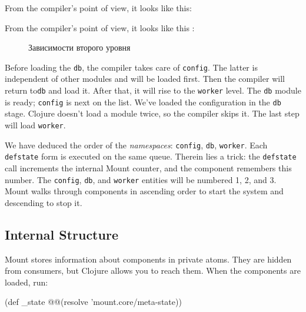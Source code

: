\fi

\ifx\MODE\PRINT

\noindent
From the compiler's point of view, it looks like this:

\begin{figure}[h!]
\end{figure}

\fi

\ifx\MODE\EBOOK

\noindent
From the compiler's point of view, it looks like this :

\begin{figure}[b!]
  \caption{Зависимости второго уровня}
  \label{fig:chart-sys-3}
\end{figure}

\fi

Before loading the \verb|db|, the compiler takes care of \verb|config|. The latter is independent of other modules and will be loaded first. Then the compiler will return to\verb|db| and load it. After that, it will rise to the \verb|worker| level. The \verb|db| module is ready; \verb|config| is next on the list. We've loaded the configuration in the \verb|db| stage. Clojure doesn't load a module twice, so the compiler skips it. The last step will load \verb|worker|.


We have deduced the order of the \emph{namespaces}: \verb|config|, \verb|db|, \verb|worker|. Each \verb|defstate| form is executed on the same queue. Therein lies a trick: the \verb|defstate| call increments the internal Mount counter, and the component remembers this number. The \verb|config|, \verb|db|, and \verb|worker| entities will be numbered 1, 2, and 3. Mount walks through components in ascending order to start the system and descending to stop it.

\subsection{Internal Structure}

Mount stores information about components in private atoms. They are hidden from consumers, but Clojure allows you to reach them. When the components are loaded, run:

\ifnarrow

\begin{english}
  \begin{clojure}
(def _state
  @@(resolve 'mount.core/meta-state))
  \end{clojure}
\end{english}

